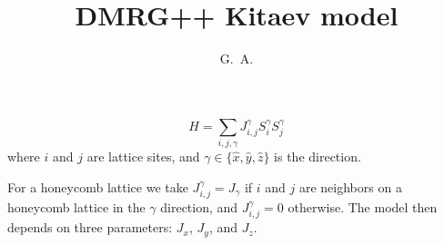 \documentclass{article}
\begin{document}
\title{DMRG++ Kitaev model}
\author{G.~A.}
\maketitle

\[
H=\sum_{i,j,\gamma}J^\gamma_{i,j}S_i^\gamma S_j^\gamma
\]
where $i$ and $j$ are lattice sites, and $\gamma\in\{\hat{x}, \hat{y}, \hat{z}\}$ is the direction.

For a honeycomb lattice we take $J^{\gamma}_{i,j}=J_\gamma$ if $i$ and $j$ are neighbors
on a honeycomb lattice in the $\gamma$ direction, and $J^{\gamma}_{i,j}=0$ otherwise.
The model then depends on three parameters: $J_x$, $J_y$, and $J_z$.
\end{document}
